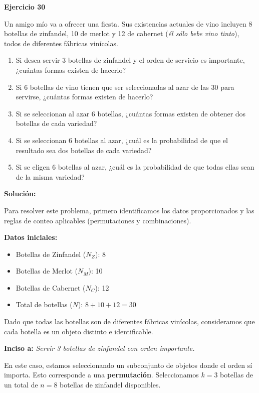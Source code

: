 \documentclass[a4paper]{article}
\begin{document}
\textbf{Ejercicio 30}

Un amigo mío va a ofrecer una fiesta. Sus existencias actuales de vino incluyen 8 botellas de zinfandel, 10 de merlot y 12 de cabernet (\textit{él sólo bebe vino tinto}), todos de diferentes fábricas vinícolas.

\begin{enumerate}
    \item[\textbf{a.}] Si desea servir 3 botellas de zinfandel y el orden de servicio es importante, ¿cuántas formas existen de hacerlo?
    \item[\textbf{b.}] Si 6 botellas de vino tienen que ser seleccionadas al azar de las 30 para servirse, ¿cuántas formas existen de hacerlo?
    \item[\textbf{c.}] Si se seleccionan al azar 6 botellas, ¿cuántas formas existen de obtener dos botellas de cada variedad?
    \item[\textbf{d.}] Si se seleccionan 6 botellas al azar, ¿cuál es la probabilidad de que el resultado sea dos botellas de cada variedad?
    \item[\textbf{e.}] Si se eligen 6 botellas al azar, ¿cuál es la probabilidad de que todas ellas sean de la misma variedad?
\end{enumerate}

\vspace{0.5cm}

\textbf{Solución:}

Para resolver este problema, primero identificamos los datos proporcionados y las reglas de conteo aplicables (permutaciones y combinaciones).

\textbf{Datos iniciales:}
\begin{itemize}
    \item Botellas de Zinfandel ($N_Z$): 8
    \item Botellas de Merlot ($N_M$): 10
    \item Botellas de Cabernet ($N_C$): 12
    \item Total de botellas ($N$): $8 + 10 + 12 = 30$
\end{itemize}

Dado que todas las botellas son de diferentes fábricas vinícolas, consideramos que cada botella es un objeto distinto e identificable.

\vspace{0.3cm}

\textbf{Inciso a:} \textit{Servir 3 botellas de zinfandel con orden importante.}

En este caso, estamos seleccionando un subconjunto de objetos donde el orden sí importa. Esto corresponde a una \textbf{permutación}. Seleccionamos $k=3$ botellas de un total de $n=8$ botellas de zinfandel disponibles.
\end{document}
